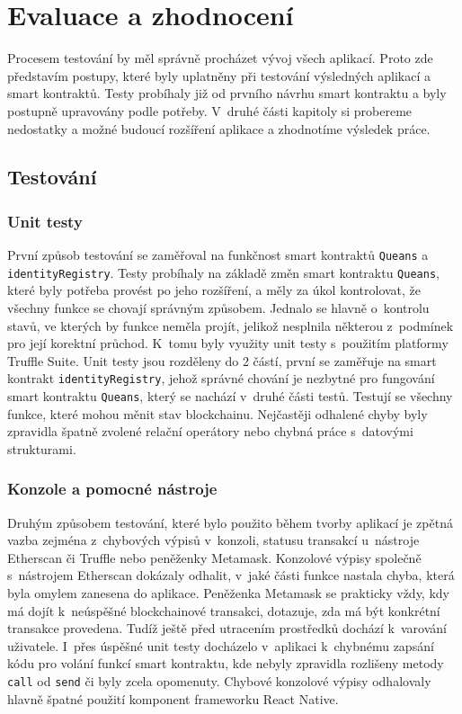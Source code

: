 \chapter{Evaluace a zhodnocení}
\label{chapter:7}
Procesem testování by měl správně procházet vývoj všech aplikací. Proto zde představím postupy, které byly uplatněny při testování výsledných aplikací a smart kontraktů. Testy probíhaly již od prvního návrhu smart kontraktu a byly postupně upravovány podle potřeby. V~druhé části kapitoly si probereme nedostatky a možné budoucí rozšíření aplikace a zhodnotíme výsledek práce. 

\section{Testování}
\subsection*{Unit testy}
První způsob testování se zaměřoval na funkčnost smart kontraktů \texttt{Queans} a \texttt{identity\-Registry}. Testy probíhaly na základě změn smart kontraktu \texttt{Queans}, které byly potřeba provést po jeho rozšíření, a měly za úkol kontrolovat, že všechny funkce se chovají správným způsobem. Jednalo se hlavně o~kontrolu stavů, ve kterých by funkce neměla projít, jelikož nesplnila některou z~podmínek pro její korektní průchod. K~tomu byly využity unit testy s~použitím platformy Truffle Suite. Unit testy jsou rozděleny do 2 částí, první se zaměřuje na smart kontrakt \texttt{identityRegistry}, jehož správné chování je nezbytné pro fungování smart kontraktu \texttt{Queans}, který se nachází v~druhé části testů. Testují se všechny funkce, které mohou měnit stav blockchainu. Nejčastěji odhalené chyby byly zpravidla špatně zvolené relační operátory nebo chybná práce s~datovými strukturami.
\subsection*{Konzole a pomocné nástroje}
Druhým způsobem testování, které bylo použito během tvorby aplikací je zpětná vazba zejména z~chybových výpisů v~konzoli, statusu transakcí u~nástroje Etherscan či Truffle nebo peněženky Metamask. Konzolové výpisy společně s~nástrojem Etherscan dokázaly odhalit, v~jaké části funkce nastala chyba, která byla omylem zanesena do aplikace. Peněženka Metamask se prakticky vždy, kdy má dojít k~neúspěšné blockchainové transakci, dotazuje, zda má být konkrétní transakce provedena. Tudíž ještě před utracením prostředků dochází k~varování uživatele. I~přes úspěšné unit testy docházelo v~aplikaci k~chybnému zapsání kódu pro volání funkcí smart kontraktu, kde nebyly zpravidla rozlišeny metody \texttt{call} od \texttt{send} či byly zcela opomenuty. Chybové konzolové výpisy odhalovaly hlavně špatné použití komponent frameworku React Native.  

